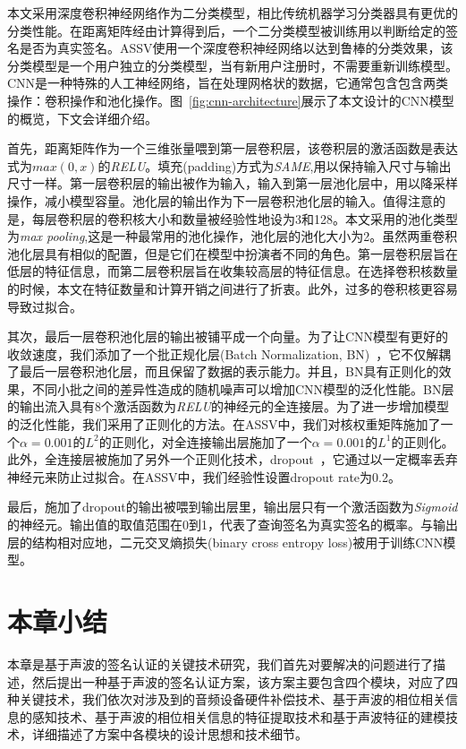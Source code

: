 本文采用深度卷积神经网络作为二分类模型，相比传统机器学习分类器具有更优的分类性能。在距离矩阵经由计算得到后，一个二分类模型被训练用以判断给定的签名是否为真实签名。ASSV使用一个深度卷积神经网络以达到鲁棒的分类效果，该分类模型是一个用户独立的分类模型，当有新用户注册时，不需要重新训练模型。CNN是一种特殊的人工神经网络，旨在处理网格状的数据，它通常包含包含两类操作：卷积操作和池化操作。图~\ref{fig:cnn-architecture}展示了本文设计的CNN模型的概览，下文会详细介绍。

首先，距离矩阵作为一个三维张量喂到第一层卷积层，该卷积层的激活函数是表达式为$max(0,x)$的\textit{RELU}。填充(padding)方式为\textit{SAME},用以保持输入尺寸与输出尺寸一样。第一层卷积层的输出被作为输入，输入到第一层池化层中，用以降采样操作，减小模型容量。池化层的输出作为下一层卷积池化层的输入。值得注意的是，每层卷积层的卷积核大小和数量被经验性地设为3和128。本文采用的池化类型为\textit{max pooling},这是一种最常用的池化操作，池化层的池化大小为2。虽然两重卷积池化层具有相似的配置，但是它们在模型中扮演者不同的角色。第一层卷积层旨在低层的特征信息，而第二层卷积层旨在收集较高层的特征信息。在选择卷积核数量的时候，本文在特征数量和计算开销之间进行了折衷。此外，过多的卷积核更容易导致过拟合。


其次，最后一层卷积池化层的输出被铺平成一个向量。为了让CNN模型有更好的收敛速度，我们添加了一个批正规化层(Batch Normalization, BN)~\cite{ioffe2015batch}，它不仅解耦了最后一层卷积池化层，而且保留了数据的表示能力。并且，BN具有正则化的效果，不同小批之间的差异性造成的随机噪声可以增加CNN模型的泛化性能。BN层的输出流入具有8个激活函数为\textit{RELU}的神经元的全连接层。为了进一步增加模型的泛化性能，我们采用了正则化的方法。在ASSV中，我们对核权重矩阵施加了一个$\alpha=0.001$的$L^2$的正则化，对全连接输出层施加了一个$\alpha=0.001$的$L^1$的正则化。此外，全连接层被施加了另外一个正则化技术，dropout~\cite{srivastava2014dropout}，它通过以一定概率丢弃神经元来防止过拟合。在ASSV中，我们经验性设置dropout rate为0.2。

最后，施加了dropout的输出被喂到输出层里，输出层只有一个激活函数为\textit{Sigmoid}的神经元。输出值的取值范围在0到1，代表了查询签名为真实签名的概率。与输出层的结构相对应地，二元交叉熵损失(binary cross entropy loss)被用于训练CNN模型。

\section{本章小结}
本章是基于声波的签名认证的关键技术研究，我们首先对要解决的问题进行了描述，然后提出一种基于声波的签名认证方案，该方案主要包含四个模块，对应了四种关键技术，我们依次对涉及到的音频设备硬件补偿技术、基于声波的相位相关信息的感知技术、基于声波的相位相关信息的特征提取技术和基于声波特征的建模技术，详细描述了方案中各模块的设计思想和技术细节。


